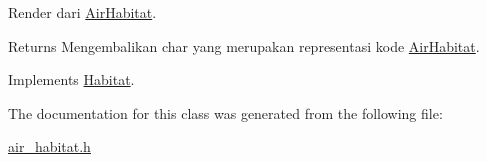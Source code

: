 Render dari \hyperlink{classAirHabitat}{Air\+Habitat}. 

\begin{DoxyReturn}{Returns}
Mengembalikan char yang merupakan representasi kode \hyperlink{classAirHabitat}{Air\+Habitat}. 
\end{DoxyReturn}


Implements \hyperlink{classHabitat_ad1bf10205d38e8e308eb9acc3aa2872c}{Habitat}.



The documentation for this class was generated from the following file\+:\begin{DoxyCompactItemize}
\item 
\hyperlink{air__habitat_8h}{air\+\_\+habitat.\+h}\end{DoxyCompactItemize}
